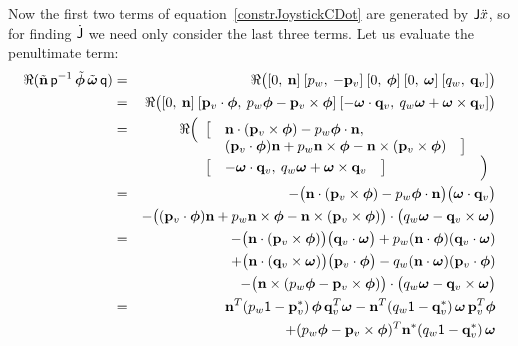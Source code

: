 Now the first two terms of equation~\ref{constrJoystickCDot} are generated by $\mathsf{J}\ddot{x}$, so
for finding $\dot{\mathsf{J}}$ we need only consider the last three terms. Let us evaluate the
penultimate term:
\begin{eqnarray*}
\Re(\tilde{\ve{n}}\, \q{p}^{-1}\, \tilde{\ve{\phi}}\,\tilde{\ve{\omega}}\, \q{q}) & = &
    \Re\big( [0,\:\ve{n}]\: [p_w,\:-\ve{p}_v]\: [0,\:\ve{\phi}]\: [0,\:\ve{\omega}]\:
    [q_w,\:\ve{q}_v] \big) \\*
&=& \Re\big( [0,\:\ve{n}]\: [\ve{p}_v \cdot \ve{\phi},\: p_w\ve{\phi} - \ve{p}_v\times\ve{\phi}]\:
    [-\ve{\omega}\cdot\ve{q}_v,\: q_w\ve{\omega} + \ve{\omega}\times\ve{q}_v] \big) \\*
&=& \Re\Big( \begin{array}[t]{lll} \big[ &
    \ve{n}\cdot(\ve{p}_v\times\ve{\phi}) - p_w \ve{\phi}\cdot\ve{n}, &\\ &
    (\ve{p}_v\cdot\ve{\phi}) \ve{n} + p_w\ve{n}\times\ve{\phi} -
        \ve{n}\times(\ve{p}_v\times\ve{\phi}) \quad\big] &\\
    \big[ & -\ve{\omega}\cdot\ve{q}_v,\: q_w\ve{\omega} +
        \ve{\omega}\times\ve{q}_v \quad\big] & \Big) \end{array} \\
&=& -\big( \ve{n}\cdot(\ve{p}_v\times\ve{\phi}) - p_w \ve{\phi}\cdot\ve{n} \big)
     \big( \ve{\omega}\cdot\ve{q}_v \big) \\* &&
    -\big( (\ve{p}_v\cdot\ve{\phi}) \ve{n} + p_w\ve{n}\times\ve{\phi} -
        \ve{n}\times(\ve{p}_v\times\ve{\phi}) \big) \cdot
     \big( q_w\ve{\omega} - \ve{q}_v\times\ve{\omega} \big) \\
&=& -\big( \ve{n}\cdot(\ve{p}_v\times\ve{\phi}) \big) \big( \ve{q}_v\cdot\ve{\omega} \big)
    + p_w (\ve{n}\cdot\ve{\phi}) (\ve{q}_v\cdot\ve{\omega}) \\* &&
    +\big( \ve{n}\cdot(\ve{q}_v\times\ve{\omega}) \big) \big( \ve{p}_v\cdot\ve{\phi} \big)
    - q_w (\ve{n}\cdot\ve{\omega}) (\ve{p}_v\cdot\ve{\phi}) \\* &&
    -\big( \ve{n}\times(p_w\ve{\phi} - \ve{p}_v\times\ve{\phi}) \big) \cdot
     \big( q_w\ve{\omega} - \ve{q}_v\times\ve{\omega} \big) \\
&=&  \ve{n}^T (p_w\m{1} - \dual{\ve{p}_v})\, \ve{\phi}\,\ve{q}_v^T \ve{\omega}
    -\ve{n}^T (q_w\m{1} - \dual{\ve{q}_v})\, \ve{\omega}\,\ve{p}_v^T \ve{\phi} \\* &&
    +(p_w\ve{\phi} - \ve{p}_v\times\ve{\phi})^T \dual{\ve{n}}
    (q_w\m{1} - \dual{\ve{q}_v})\, \ve{\omega}
\end{eqnarray*}

